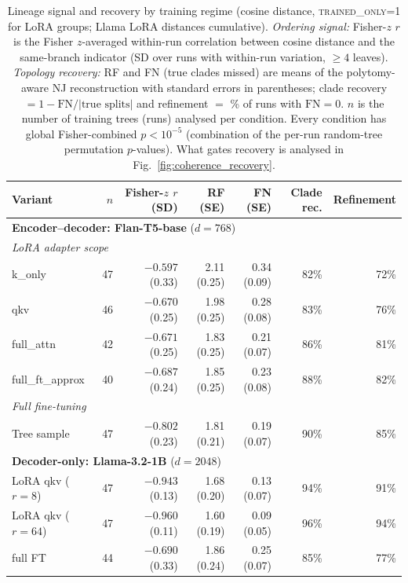 \documentclass{article}
\theoremstyle{definition}
\theoremstyle{plain}
\begin{document}
\begin{table}[t]
\caption{Lineage signal and recovery by training regime (cosine distance, \textsc{trained\_only=1}
  for LoRA groups; Llama LoRA distances cumulative). \emph{Ordering signal:} Fisher-$z$ $r$ is the
  Fisher $z$-averaged within-run correlation between cosine distance and the same-branch indicator
  (SD over runs with within-run variation, $\geq 4$ leaves). \emph{Topology recovery:} RF and FN
  (true clades missed) are means of the polytomy-aware NJ reconstruction with standard errors in
  parentheses; clade recovery $=1-\mathrm{FN}/|\text{true splits}|$ and refinement $=$ \% of runs with
  $\mathrm{FN}=0$. $n$ is the number of training trees (runs) analysed per condition. Every condition
  has global Fisher-combined $p<10^{-5}$ (combination of the per-run random-tree permutation
  $p$-values). What gates recovery is analysed in Fig.~\ref{fig:coherence_recovery}.}
\label{tab:variants}
\begin{center}
\setlength{\tabcolsep}{4pt}
\begin{tabular}{lrrrrrr}
\toprule
Variant & $n$ & Fisher-$z$ $r$ (SD) & RF (SE) & FN (SE) & Clade rec. & Refinement \\
\midrule
\multicolumn{7}{l}{\textbf{Encoder--decoder: Flan-T5-base} ($d=768$)} \\
\multicolumn{7}{l}{\quad\textit{LoRA adapter scope}} \\
\quad k\_only          & 47 & $-0.597$ (0.33) & 2.11 (0.25) & 0.34 (0.09) & 82\% & 72\% \\
\quad qkv              & 46 & $-0.670$ (0.25) & 1.98 (0.25) & 0.28 (0.08) & 83\% & 76\% \\
\quad full\_attn       & 42 & $-0.671$ (0.25) & 1.83 (0.25) & 0.21 (0.07) & 86\% & 81\% \\
\quad full\_ft\_approx & 40 & $-0.687$ (0.24) & 1.85 (0.25) & 0.23 (0.08) & 88\% & 82\% \\
\multicolumn{7}{l}{\quad\textit{Full fine-tuning}} \\
\quad Tree sample      & 47 & $-0.802$ (0.23) & 1.81 (0.21) & 0.19 (0.07) & 90\% & 85\% \\
\midrule
\multicolumn{7}{l}{\textbf{Decoder-only: Llama-3.2-1B} ($d=2048$)} \\
\quad LoRA qkv ($r{=}8$)  & 47 & $-0.943$ (0.13) & 1.68 (0.20) & 0.13 (0.07) & 94\% & 91\% \\
\quad LoRA qkv ($r{=}64$) & 47 & $-0.960$ (0.11) & 1.60 (0.19) & 0.09 (0.05) & 96\% & 94\% \\
\quad full FT             & 44 & $-0.690$ (0.33) & 1.86 (0.24) & 0.25 (0.07) & 85\% & 77\% \\
\bottomrule
\end{tabular}
\end{center}
\end{table}
\end{document}
